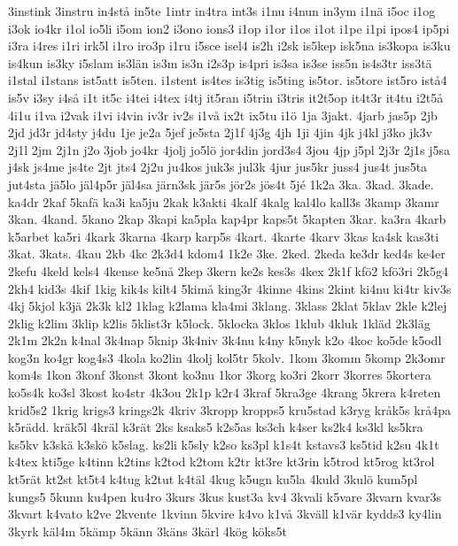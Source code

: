 {3instink
3instru
in4st^^e5
in5te
1intr
in4tra
int3s
i1nu
i4nun
in3ym
i1n^^e4
i5oc
i1og
i3ok
io4kr
i1ol
io5li
i5om
ion2
i3ono
ions3
i1op
i1or
i1os
i1ot
i1pe
i1pi
ipos4
ip5pi
i3ra
i4res
i1ri
irk5l
i1ro
iro3p
i1ru
i5sce
isel4
is2h
i2sk
is5kep
isk5na
is3kopa
is3ku
is4kun
is3ky
i5slam
is3l^^e4n
is3m
is3n
i2s3p
is4pri
is3sa
is3se
iss5n
is4s3tr
iss3t^^e4
i1stal
i1stans
ist5att
is5ten.
i1stent
is4tes
is3tig
is5ting
is5tor.
is5tore
ist5ro
ist^^e54
is5v
i3sy
i4s^^e5
i1t
it5c
i4tei
i4tex
i4tj
it5ran
i5trin
i3tris
it2t5op
it4t3r
it4tu
i2t5^^e5
4i1u
i1va
i2vak
i1vi
i4vin
iv3r
iv2s
i1v^^e5
ix2t
ix5tu
i1^^f6
1ja
3jakt.
4jarb
jas5p
2jb
2jd
jd3r
jd4sty
j4du
1je
je2a
5jef
je5sta
2j1f
4j3g
4jh
1ji
4jin
4jk
j4kl
j3ko
jk3v
2j1l
2jm
2j1n
j2o
3job
jo4kr
4jolj
jo5l^^f6
jor4din
jord3s4
3jou
4jp
j5pl
2j3r
2j1s
j5sa
j4sk
js4me
js4te
2jt
jts4
2j2u
ju4kos
juk3s
jul3k
4jur
jus5kr
juss4
jus4t
jus5ta
jut4sta
j^^e45lo
j^^e4l4p5r
j^^e4l4sa
j^^e4rn3sk
j^^e4r5s
j^^f6r2s
j^^f6s4t
5j^^e9
1k2a
3ka.
3kad.
3kade.
ka4dr
2kaf
5kaf^^e4
ka3i
ka5ju
2kak
k3akti
4kalf
4kalg
kal4lo
kall3s
3kamp
3kamr
3kan.
4kand.
5kano
2kap
3kapi
ka5pla
kap4pr
kaps5t
5kapten
3kar.
ka3ra
4karb
k5arbet
ka5ri
4kark
3karna
4karp
karp5s
4kart.
4karte
4karv
3kas
ka4sk
kas3ti
3kat.
3kats.
4kau
2kb
4kc
2k3d4
kdom4
1k2e
3ke.
2ked.
2keda
ke3dr
ked4s
ke4er
2kefu
4keld
kels4
4kense
ke5n^^e5
2kep
3kern
ke2s
kes3s
4kex
2k1f
kf^^f62
kf^^f63ri
2k5g4
2kh4
kid3s
4kif
1kig
kik4s
kilt4
5kim^^e5
king3r
4kinne
4kins
2kint
ki4nu
ki4tr
kiv3s
4kj
5kjol
k3j^^e4
2k3k
kl2
1klag
k2lama
kla4mi
3klang.
3klass
2klat
5klav
2kle
k2lej
2klig
k2lim
3klip
k2lis
5klist3r
k5lock.
5klocka
3klos
1klub
4kluk
1kl^^e4d
2k3l^^e4g
2k1m
2k2n
k4nal
3k4nap
5knip
3k4niv
3k4nu
k4ny
k5nyk
k2o
4koc
ko5de
k5odl
kog3n
ko4gr
kog4s3
4kola
ko2lin
4kolj
kol5tr
5kolv.
1kom
3komm
5komp
2k3omr
kom4s
1kon
3konf
3konst
3kont
ko3nu
1kor
3korg
ko3ri
2korr
3korres
5kortera
ko5s4k
ko3sl
3kost
ko4str
4k3ou
2k1p
k2r4
3kraf
5kra3ge
4krang
5krera
k4reten
krid5s2
1krig
krigs3
krings2k
4kriv
3kropp
kropps5
kru5stad
k3ryg
kr^^e5k5s
kr^^e54pa
k5r^^e4dd.
kr^^e4k5l
4kr^^e4l
k3r^^e4t
2ks
ksaks5
k2s5as
ks3ch
k4ser
ks2k4
ks3kl
ks5kra
ks5kv
k3sk^^e4
k3sk^^f6
k5slag.
ks2li
k5sly
k2so
ks3pl
k1s4t
kstavs3
ks5tid
k2su
4k1t
k4tex
kti5ge
k4tinn
k2tins
k2tod
k2tom
k2tr
kt3re
kt3rin
k5trod
kt5rog
kt3rol
kt5r^^e4t
kt2st
kt5t4
k4tug
k2tut
k4t^^e4l
4kug
k5ugn
ku5la
4kuld
3kul^^f6
kum5pl
kungs5
5kunn
ku4pen
ku4ro
3kurs
3kus
kust3a
kv4
3kvali
k5vare
3kvarn
kvar3s
3kvart
k4vato
k2ve
2kvente
1kvinn
5kvire
k4vo
k1v^^e5
3kv^^e4ll
k1v^^e4r
kydds3
ky4lin
3kyrk
k^^e4l4m
5k^^e4mp
5k^^e4nn
3k^^e4ns
3k^^e4rl
4k^^f6g
k^^f6ks5t
}
